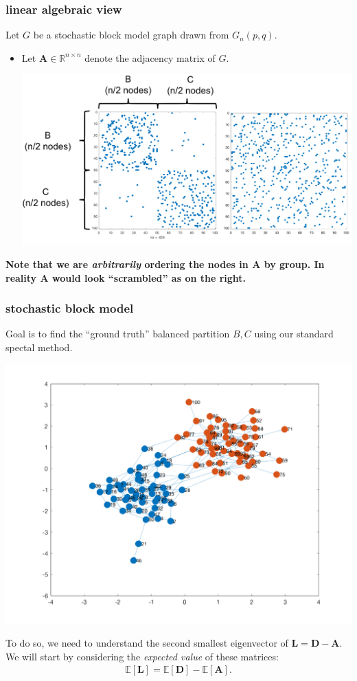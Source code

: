\documentclass[compress]{beamer}
\newcommand{\bv}[1]{\mathbf{#1}}
\newcommand{\R}{\mathbb{R}}
\newcommand{\E}{\mathbb{E}}
\begin{document}
\begin{frame}
	\frametitle{linear algebraic view}
	Let $G$ be a stochastic block model graph drawn from $G_n(p,q)$. 
	\begin{itemize}
		\item Let $\bv A \in \R^{n \times n}$ denote the adjacency matrix of $G$.
		\begin{center}
			\hspace{-3em}\includegraphics[width=.9\textwidth]{scrambled.png}
		\end{center}
	\end{itemize}
	\textbf{Note that we are \emph{arbitrarily} ordering the nodes in $\bv{A}$ by group. In reality $\bv{A}$ would look ``scrambled'' as on the right.}
\end{frame}

\begin{frame}
	\frametitle{stochastic block model}
	Goal is to find the ``ground truth'' balanced partition $B,C$ using our standard spectal method.
	\begin{center}
				\vspace{-1em}
		\includegraphics[width=.5\textwidth]{stochasticBlock.png}
		\vspace{-1em}
	\end{center}
	To do so, we need to understand the second smallest eigenvector of $\bv{L} = \bv{D} - \bv{A}$. We will start by considering the \emph{expected value} of these matrices:
	\begin{align*}
		\E[\bv{L}] = \E[\bv{D}] -  \E[\bv{A}].
	\end{align*}
\end{frame}
\end{document}
